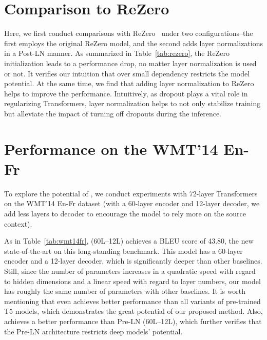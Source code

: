 \section{Comparison to ReZero}
\label{appendix:rezero}

Here, we first conduct comparisons with ReZero~\cite{Bachlechner2020ReZeroIA} under two configurations--the first employs the original ReZero model, and the second adds layer normalizations in a Post-LN manner. 
As summarized in Table~\ref{tab:rezero}, the ReZero initialization leads to a performance drop, no matter layer normalization is used or not. 
It verifies our intuition that over small dependency restricts the model potential. 
At the same time, we find that adding layer normalization to ReZero helps to improve the performance. 
Intuitively, as dropout plays a vital role in regularizing Transformers, layer normalization helps to not only stabilize training but alleviate the impact of turning off dropouts during the inference. 

\section{Performance on the WMT'14 En-Fr}
\label{appendix:enfr}

To explore the potential of \our, we conduct experiments with 72-layer Transformers on the WMT'14 En-Fr dataset (with a 60-layer encoder and 12-layer decoder, we add less layers to decoder to encourage the model to rely more on the source context). 

As in Table~\ref{tab:wmt14fr}, \our (60L--12L) achieves a BLEU score of 43.80, the new state-of-the-art on this long-standing benchmark. 
This model has a 60-layer encoder and a 12-layer decoder, which is significantly deeper than other baselines.
Still, since the number of parameters increases in a quadratic speed with regard to hidden dimensions and a linear speed with regard to layer numbers, our model has roughly the same number of parameters with other baselines. 
It is worth mentioning that \our even achieves better performance than all variants of pre-trained T5 models, which demonstrates the great potential of our proposed method.
Also, \our achieves a better performance than Pre-LN (60L--12L), which further verifies that the Pre-LN architecture restricts deep models' potential. 




